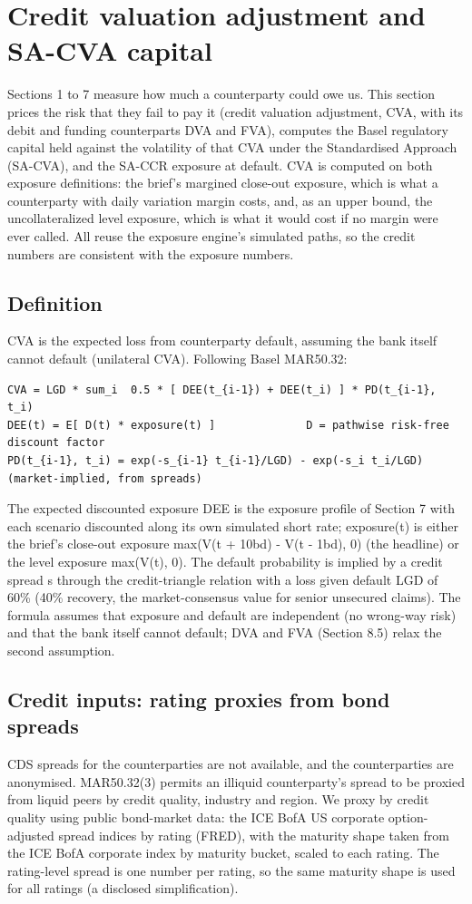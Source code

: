 \documentclass[11pt,letterpaper]{article}
\begin{document}
\section{Credit valuation adjustment and SA-CVA capital}
Sections 1 to 7 measure how much a counterparty could owe us. This section prices the risk that they fail to pay it (credit valuation adjustment, CVA, with its debit and funding counterparts DVA and FVA), computes the Basel regulatory capital held against the volatility of that CVA under the Standardised Approach (SA-CVA), and the SA-CCR exposure at default. CVA is computed on both exposure definitions: the brief's margined close-out exposure, which is what a counterparty with daily variation margin costs, and, as an upper bound, the uncollateralized level exposure, which is what it would cost if no margin were ever called. All reuse the exposure engine's simulated paths, so the credit numbers are consistent with the exposure numbers.

\subsection{Definition}
CVA is the expected loss from counterparty default, assuming the bank itself cannot default (unilateral CVA). Following Basel MAR50.32:

{\fontsize{7.2}{8.8}\selectfont
\begin{verbatim}
CVA = LGD * sum_i  0.5 * [ DEE(t_{i-1}) + DEE(t_i) ] * PD(t_{i-1}, t_i)
DEE(t) = E[ D(t) * exposure(t) ]              D = pathwise risk-free discount factor
PD(t_{i-1}, t_i) = exp(-s_{i-1} t_{i-1}/LGD) - exp(-s_i t_i/LGD)      (market-implied, from spreads)
\end{verbatim}}
The expected discounted exposure DEE is the exposure profile of Section 7 with each scenario discounted along its own simulated short rate; exposure(t) is either the brief's close-out exposure max(V(t + 10bd) - V(t - 1bd), 0) (the headline) or the level exposure max(V(t), 0). The default probability is implied by a credit spread s through the credit-triangle relation with a loss given default LGD of 60\% (40\% recovery, the market-consensus value for senior unsecured claims). The formula assumes that exposure and default are independent (no wrong-way risk) and that the bank itself cannot default; DVA and FVA (Section 8.5) relax the second assumption.

\subsection{Credit inputs: rating proxies from bond spreads}
CDS spreads for the counterparties are not available, and the counterparties are anonymised. MAR50.32(3) permits an illiquid counterparty's spread to be proxied from liquid peers by credit quality, industry and region. We proxy by credit quality using public bond-market data: the ICE BofA US corporate option-adjusted spread indices by rating (FRED), with the maturity shape taken from the ICE BofA corporate index by maturity bucket, scaled to each rating. The rating-level spread is one number per rating, so the same maturity shape is used for all ratings (a disclosed simplification).
\end{document}
